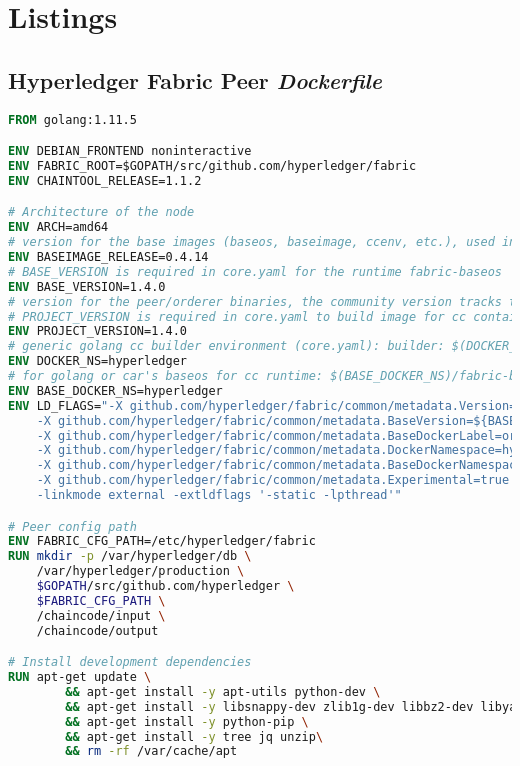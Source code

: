 \newpage
\section{Listings}
\subsection{Hyperledger Fabric Peer \textit{Dockerfile}} \label{lst:dockerfile-hl-peer}
\begin{lstlisting}[language=Dockerfile]
FROM golang:1.11.5

ENV DEBIAN_FRONTEND noninteractive
ENV FABRIC_ROOT=$GOPATH/src/github.com/hyperledger/fabric
ENV CHAINTOOL_RELEASE=1.1.2

# Architecture of the node
ENV ARCH=amd64
# version for the base images (baseos, baseimage, ccenv, etc.), used in core.yaml as BaseVersion
ENV BASEIMAGE_RELEASE=0.4.14
# BASE_VERSION is required in core.yaml for the runtime fabric-baseos
ENV BASE_VERSION=1.4.0
# version for the peer/orderer binaries, the community version tracks the hash value like 1.0.0-snapshot-51b7e85
# PROJECT_VERSION is required in core.yaml to build image for cc container
ENV PROJECT_VERSION=1.4.0
# generic golang cc builder environment (core.yaml): builder: $(DOCKER_NS)/fabric-ccenv:$(ARCH)-$(PROJECT_VERSION)
ENV DOCKER_NS=hyperledger
# for golang or car's baseos for cc runtime: $(BASE_DOCKER_NS)/fabric-baseos:$(ARCH)-$(BASEIMAGE_RELEASE)
ENV BASE_DOCKER_NS=hyperledger
ENV LD_FLAGS="-X github.com/hyperledger/fabric/common/metadata.Version=${BASE_VERSION} \
    -X github.com/hyperledger/fabric/common/metadata.BaseVersion=${BASEIMAGE_RELEASE} \
    -X github.com/hyperledger/fabric/common/metadata.BaseDockerLabel=org.hyperledger.fabric \
    -X github.com/hyperledger/fabric/common/metadata.DockerNamespace=hyperledger \
    -X github.com/hyperledger/fabric/common/metadata.BaseDockerNamespace=hyperledger \
    -X github.com/hyperledger/fabric/common/metadata.Experimental=true \
    -linkmode external -extldflags '-static -lpthread'"

# Peer config path
ENV FABRIC_CFG_PATH=/etc/hyperledger/fabric
RUN mkdir -p /var/hyperledger/db \
    /var/hyperledger/production \
    $GOPATH/src/github.com/hyperledger \
    $FABRIC_CFG_PATH \
    /chaincode/input \
    /chaincode/output

# Install development dependencies
RUN apt-get update \
        && apt-get install -y apt-utils python-dev \
        && apt-get install -y libsnappy-dev zlib1g-dev libbz2-dev libyaml-dev libltdl-dev libtool \
        && apt-get install -y python-pip \
        && apt-get install -y tree jq unzip\
        && rm -rf /var/cache/apt


\end{lstlisting}
